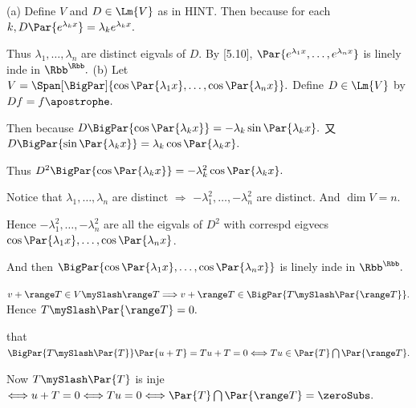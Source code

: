 \par\quad
(a) Define $V$ and $D\in\Lm{V}$ as in H{\small INT}. Then because for each $k, D\Par{e^{\lambda_k x}}=\lambda_k e^{\lambda_k x}.$\par\quad\Ha
Thus $\lambda_1,\dots,\lambda_n$ are distinct eigvals of $D.$ By [5.10], $\Par{e^{\lambda_1x},\dots,e^{\lambda_nx}}$ is linely inde in $\Rbb^{\Rbb}.$\PfEnd\vspace{2pt}\quad
(b) Let $V=\Span[\BigPar]{\cos\Par{\lambda_1 x},\dots,\cos\Par{\lambda_n x}}.$ Define $D\in\Lm{V}$ by $Df=f\apostrophe.$\par\quad\Hb
Then because $D\BigPar{\cos\Par{\lambda_k x}}=-\lambda_k\sin\Par{\lambda_k x}.$ 又 $D\BigPar{\sin\Par{\lambda_k x}}=\lambda_k\cos\Par{\lambda_k x}.$\par\quad\Hb
Thus $D^2\BigPar{\cos\Par{\lambda_k x}}=-\lambda_k^2\cos\Par{\lambda_k x}.$\par\quad\Hb
Notice that $\lambda_1,\dots,\lambda_n$ are distinct $\Longrightarrow$ $-\lambda_1^2,\dots,-\lambda_n^2$ are distinct. And $\dim V=n.$\par\quad\Hb
Hence $-\lambda_1^2,\dots,-\lambda_n^2$ are all the eigvals of $D^2$ with correspd eigvecs $\cos\Par{\lambda_1 x},\dots,\cos\Par{\lambda_n x}$.\par\quad\Hb
And then $\BigPar{\cos\Par{\lambda_1 x},\dots,\cos\Par{\lambda_n x}}$ is linely inde in $\Rbb^{\Rbb}.$\PfEnd
\SepLine

$v+\range T\in V\mySlash \range T\Longrightarrow v+\range T\in\null\BigPar{T\mySlash \Par{\range T}}.$ Hence $T\mySlash \Par{\range T}=0.$\PfEnd
\SepLine

\NOTICE that $\BigPar{T\mySlash \Par{\null T}}\Par{u+\null T}=Tu+\null T=0\Longleftrightarrow Tu\in\Par{\null T}\bigcap\Par{\range T}.$\par
\Blind{\Solution} Now $T\mySlash \Par{\null T}$ is inje $\Longleftrightarrow u+\null T=0\Longleftrightarrow Tu=0 \Longleftrightarrow\Par{\null T}\bigcap\Par{\range T}=\zeroSubs.$\PfEnd
\SepLine

